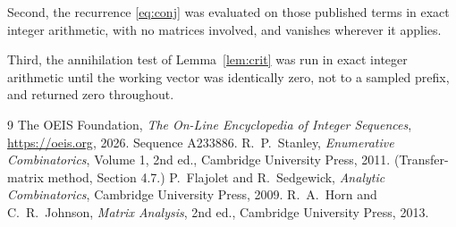 \documentclass[11pt,a4paper]{article}
\theoremstyle{plain}
\theoremstyle{definition}
\begin{document}
Second, the recurrence \eqref{eq:conj} was evaluated on those published terms in exact
integer arithmetic, with no matrices involved, and vanishes wherever it applies.

Third, the annihilation test of Lemma~\ref{lem:crit} was run in exact integer arithmetic
until the working vector was identically zero, not to a sampled prefix, and returned zero
throughout.

\begin{thebibliography}{9}
 The OEIS Foundation, \emph{The On-Line Encyclopedia of Integer
Sequences}, \url{https://oeis.org}, 2026. Sequence A233886.
 R.~P.~Stanley, \emph{Enumerative Combinatorics}, Volume 1, 2nd ed.,
Cambridge University Press, 2011. (Transfer-matrix method, Section 4.7.)
 P.~Flajolet and R.~Sedgewick, \emph{Analytic Combinatorics}, Cambridge
University Press, 2009.
 R.~A.~Horn and C.~R.~Johnson, \emph{Matrix Analysis}, 2nd ed., Cambridge
University Press, 2013.
\end{thebibliography}
\end{document}
